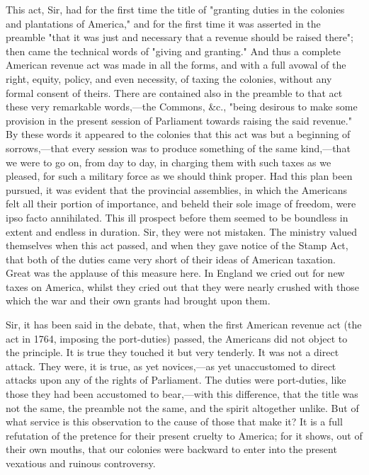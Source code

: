 This act, Sir, had for the first time the title of "granting duties in the colonies and plantations of America," and for the first time it was asserted in the preamble "that it was just and necessary that a revenue should be raised there"; then came the technical words of "giving and granting." And thus a complete American revenue act was made in all the forms, and with a full avowal of the right, equity, policy, and even necessity, of taxing the colonies, without any formal consent of theirs. There are contained also in the preamble to that act these very remarkable words,—the Commons, \&c., "being desirous to make some provision in the present session of Parliament towards raising the said revenue." By these words it appeared to the colonies that this act was but a beginning of sorrows,—that every session was to produce something of the same kind,—that we were to go on, from day to day, in charging them with such taxes as we pleased, for such a military force as we should think proper. Had this plan been pursued, it was evident that the provincial assemblies, in which the Americans felt all their portion of importance, and beheld their sole image of freedom, were ipso facto annihilated. This ill prospect before them seemed to be boundless in extent and endless in duration. Sir, they were not mistaken. The ministry valued themselves when this act passed, and when they gave notice of the Stamp Act, that both of the duties came very short of their ideas of American taxation. Great was the applause of this measure here. In England we cried out for new taxes on America, whilst they cried out that they were nearly crushed with those which the war and their own grants had brought upon them.

Sir, it has been said in the debate, that, when the first American revenue act (the act in 1764, imposing the port-duties) passed, the Americans did not object to the principle. It is true they touched it but very tenderly. It was not a direct attack. They were, it is true, as yet novices,—as yet unaccustomed to direct attacks upon any of the rights of Parliament. The duties were port-duties, like those they had been accustomed to bear,—with this difference, that the title was not the same, the preamble not the same, and the spirit altogether unlike. But of what service is this observation to the cause of those that make it? It is a full refutation of the pretence for their present cruelty to America; for it shows, out of their own mouths, that our colonies were backward to enter into the present vexatious and ruinous controversy.

